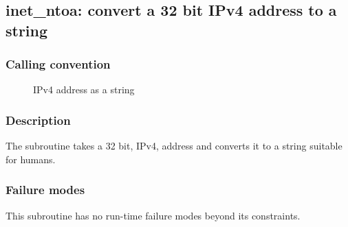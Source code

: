 \clearpage
{}
{}
\label{subr:inet-ntoa}
\subsection*{inet\_ntoa: convert a 32 bit IPv4 address to a string}

\subsubsection*{Calling convention}

\begin{description}
\item[] IPv4 address as a string
\end{description}

\subsubsection*{Description}

The  subroutine takes a 32 bit, IPv4, address
and converts it to a string suitable for humans.

\subsubsection*{Failure modes}

This subroutine has no run-time failure modes beyond its constraints.
